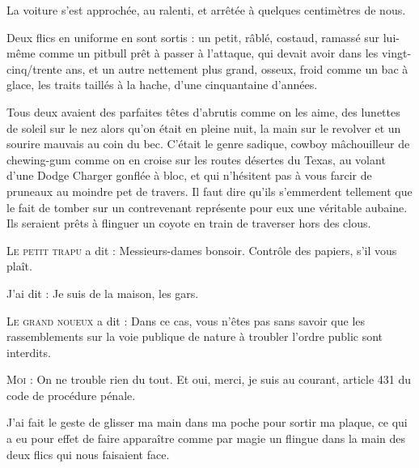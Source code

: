 \scene

La voiture s’est approchée, au ralenti, et arrêtée à quelques centimètres de nous.

Deux flics en uniforme en sont sortis : un petit, râblé, costaud, ramassé sur lui-même comme un pitbull prêt à passer à l’attaque, qui devait avoir dans les vingt-cinq/trente ans, et un autre nettement plus grand, osseux, froid comme un bac à glace, les traits taillés à la hache, d’une cinquantaine d’années.

%
%
Tous deux avaient des parfaites têtes d’abrutis comme on les aime, des lunettes de soleil sur le nez alors qu’on était en pleine nuit, la main sur le revolver et un sourire mauvais au coin du bec. C’était le genre sadique, cowboy mâchouilleur de chewing-gum comme on en croise sur les routes désertes du Texas, au volant d’une Dodge Charger gonflée à bloc, et qui n’hésitent pas à vous farcir de pruneaux au moindre pet de travers. Il faut dire qu’ils s’emmerdent tellement que le fait de tomber sur un contrevenant représente pour eux une véritable aubaine. Ils seraient prêts à flinguer un coyote en train de traverser hors des clous.

\begin{dialogue}

\textsc{Le petit trapu} a dit : Messieurs-dames bonsoir. Contrôle des papiers, s’il vous plaît.

J’ai dit : Je suis de la maison, les gars.

\textsc{Le grand noueux} a dit : Dans ce cas, vous n’êtes pas sans savoir que les rassemblements sur la voie publique de nature à troubler l’ordre public sont interdits.

\textsc{Moi} : On ne trouble rien du tout. Et oui, merci, je suis au courant, article 431 du code de procédure pénale.

\end{dialogue}

J’ai fait le geste de glisser ma main dans ma poche pour sortir ma plaque, ce qui a eu pour effet de faire apparaître comme par magie un flingue dans la main des deux flics qui nous faisaient face.

